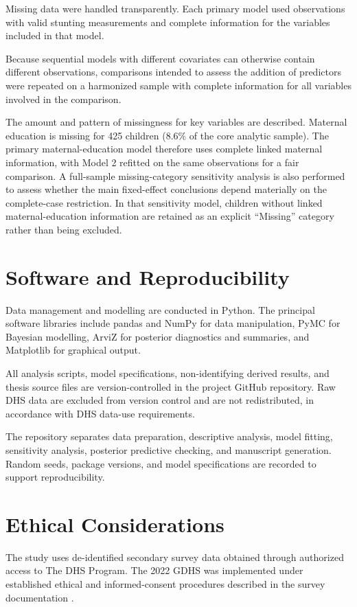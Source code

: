Missing data were handled transparently. Each primary model used observations with valid stunting measurements and complete information for the variables included in that model.

Because sequential models with different covariates can otherwise contain different observations, comparisons intended to assess the addition of predictors were repeated on a harmonized sample with complete information for all variables involved in the comparison.

The amount and pattern of missingness for key variables are described. Maternal education is missing for 425 children (8.6\% of the core analytic sample). The primary maternal-education model therefore uses complete linked maternal information, with Model 2 refitted on the same observations for a fair comparison. A full-sample missing-category sensitivity analysis is also performed to assess whether the main fixed-effect conclusions depend materially on the complete-case restriction. In that sensitivity model, children without linked maternal-education information are retained as an explicit ``Missing'' category rather than being excluded.

\section{Software and Reproducibility}

Data management and modelling are conducted in Python. The principal software libraries include pandas and NumPy for data manipulation, PyMC for Bayesian modelling, ArviZ for posterior diagnostics and summaries, and Matplotlib for graphical output.

All analysis scripts, model specifications, non-identifying derived results, and thesis source files are version-controlled in the project GitHub repository. Raw DHS data are excluded from version control and are not redistributed, in accordance with DHS data-use requirements.

The repository separates data preparation, descriptive analysis, model fitting, sensitivity analysis, posterior predictive checking, and manuscript generation. Random seeds, package versions, and model specifications are recorded to support reproducibility.

\section{Ethical Considerations}

The study uses de-identified secondary survey data obtained through authorized access to The DHS Program. The 2022 GDHS was implemented under established ethical and informed-consent procedures described in the survey documentation \cite{GSSICF2024}.

